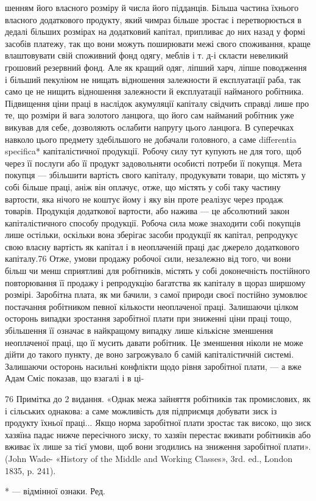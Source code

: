 шенням його власного розміру й числа його підданців. Більша
частина їхнього власного додаткового продукту, який чимраз
більше зростає і перетворюється в дедалі більших розмірах на
додатковий капітал, припливає до них назад у формі засобів
платежу, так що вони можуть поширювати межі свого споживання,
краще влаштовувати свій споживний фонд одягу, меблів
і т. д-і скласти невеликий грошовий резервний фонд. Але як
кращий одяг, ліпший харч, ліпше поводження і більший пекуліюм
не нищать відношення залежности й експлуатації раба,
так само це не нищить відношення залежности й експлуатації
найманого робітника. Підвищення ціни праці в наслідок акумуляції
капіталу свідчить справді лише про те, що розміри й вага
золотого ланцюга, що його сам найманий робітник уже викував
для себе, дозволяють ослабити напругу цього ланцюга. В суперечках
навколо цього предмету здебільшого не добачали головного,
а саме differentia specifica* капіталістичної продукції.
Робочу силу тут купують не для того, щоб через її послуги або
її продукт задовольняти особисті потреби її покупця. Мета покупця
— збільшити вартість свого капіталу, продукувати товари,
що містять у собі більше праці, аніж він оплачує, отже,
що містять у собі таку частину вартости, яка нічого не коштує
йому і яку він проте реалізує через продаж товарів. Продукція
додаткової вартости, або нажива — це абсолютний закон капіталістичного
способу продукції. Робоча сила може знаходити
собі покупців лише остільки, оскільки вона зберігає засоби продукції
як капітал, репродукує свою власну вартість як капітал
і в неоплаченій праці дає джерело додаткового капіталу.76 Отже,
умови продажу робочої сили, незалежно від того, чи вони більш
чи менш сприятливі для робітників, містять у собі доконечність
постійного повторювання її продажу і репродукцію багатства
як капіталу в щораз ширшому розмірі. Заробітна плата, як ми
бачили, з самої природи своєї постійно зумовлює постачання
робітником певної кількости неоплаченої праці. Залишаючи
цілком осторонь випадки зростання заробітної плати при зниженні
ціни праці тощо, збільшення її означає в найкращому
випадку лише кількісне зменшення неоплаченої праці, що її
мусить давати робітник. Це зменшення ніколи не може дійти до
такого пункту, де воно загрожувало б самій капіталістичній
системі. Залишаючи осторонь насильні конфлікти щодо рівня
заробітної плати, — а вже Адам Сміс показав, що взагалі і в ці-

76 Примітка до 2 видання. «Однак межа зайняття робітників так
промислових, як і сільських однакова: а саме можливість для підприємця
добувати зиск із продукту їхньої праці... Якщо норма заробітної
плати зростає так високо, що зиск хазяїна падає нижче пересічного
зиску, то хазяїн перестає вживати робітників або вживає їх лише за
тієї умови, щоб вони згодились на зниження заробітної плати». (John
Wade- «History of the Middle and Working Classes», 3rd. ed., London
1835, p. 241).

* — відмінної ознаки. Ред.
